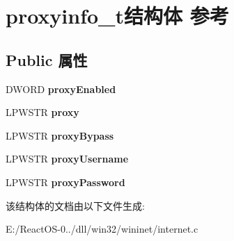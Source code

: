 \hypertarget{structproxyinfo__t}{}\section{proxyinfo\+\_\+t结构体 参考}
\label{structproxyinfo__t}
\subsection*{Public 属性}
\begin{DoxyCompactItemize}
\item 
\mbox{\label{structproxyinfo__t_abc7c2b892c7d34ed59a7fc9042593b28}} 
D\+W\+O\+RD {\bfseries proxy\+Enabled}
\item 
\mbox{\label{structproxyinfo__t_ae6f9524535b71848622fc6f28b2ce28a}} 
L\+P\+W\+S\+TR {\bfseries proxy}
\item 
\mbox{\label{structproxyinfo__t_ae7d8a29474d0dc35d4ec771e4b916bf7}} 
L\+P\+W\+S\+TR {\bfseries proxy\+Bypass}
\item 
\mbox{\label{structproxyinfo__t_a97d02db0289d2e522adc9736e8790010}} 
L\+P\+W\+S\+TR {\bfseries proxy\+Username}
\item 
\mbox{\label{structproxyinfo__t_a5947ff4fbbbc5c6114aa0bc5c54c5c78}} 
L\+P\+W\+S\+TR {\bfseries proxy\+Password}
\end{DoxyCompactItemize}


该结构体的文档由以下文件生成\+:\begin{DoxyCompactItemize}
\item 
E\+:/\+React\+O\+S-\/0../dll/win32/wininet/internet.\+c\end{DoxyCompactItemize}
